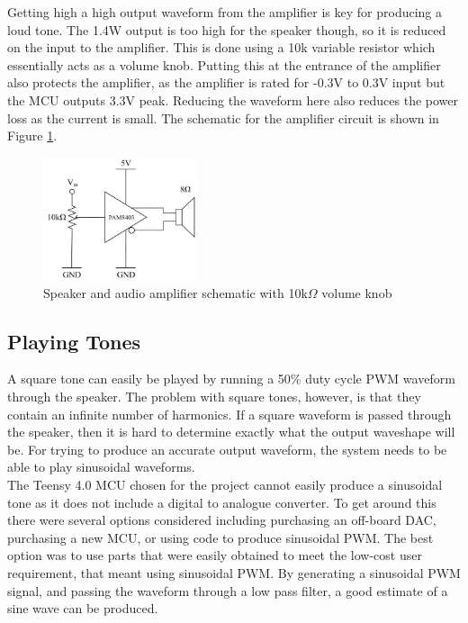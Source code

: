 Getting high a high output waveform from the amplifier is key for producing a loud tone. The 1.4W output is too high for the speaker though, so it is reduced on the input to the amplifier. This is done using a 10k variable resistor which essentially acts as a volume knob. Putting this at the entrance of the amplifier also protects the amplifier, as the amplifier is rated for -0.3V to 0.3V input but the MCU outputs 3.3V peak. Reducing the waveform here also reduces the power loss as the current is small. The schematic for the amplifier circuit is shown in Figure \ref{fig:L_amplifier}.
\begin{figure} [!htb]
	\captionsetup{justification=centering}
	\hfill\includegraphics[width=0.4\textwidth]{./images/speaker/L_Amplifier}\hspace{\fill}
	\caption{Speaker and audio amplifier schematic with 10k$\Omega$ volume knob}
	\label{fig:L_amplifier}
\end{figure}

\subsection{Playing Tones}
A square tone can easily be played by running a 50\% duty cycle PWM waveform through the speaker. The problem with square tones, however, is that they contain an infinite number of harmonics. If a square waveform is passed through the speaker, then it is hard to determine exactly what the output waveshape will be. For trying to produce an accurate output waveform, the system needs to be able to play sinusoidal waveforms. \\

The Teensy 4.0 MCU chosen for the project cannot easily produce a sinusoidal tone as it does not include a digital to analogue converter. To get around this there were several options considered including purchasing an off-board DAC, purchasing a new MCU, or using code to produce sinusoidal PWM. The best option was to use parts that were easily obtained to meet the low-cost user requirement, that meant using sinusoidal PWM. By generating a sinusoidal PWM signal, and passing the waveform through a low pass filter, a good estimate of a sine wave can be produced. \\
